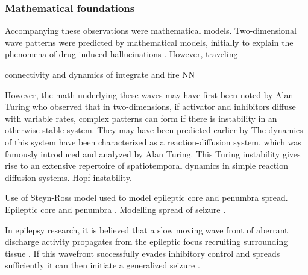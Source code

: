 
\subsubsection*{Mathematical foundations}
Accompanying these observations were mathematical models. Two-dimensional wave patterns were predicted by mathematical models, initially to explain the phenomena of drug induced hallucinations \citep{Ermentrout1979a}. However, traveling 

connectivity and dynamics of integrate and fire NN \citep{CHU1994}

However, the math underlying these waves may have first been noted by Alan Turing who observed that in two-dimensions, if activator and inhibitors diffuse with variable rates, complex patterns can form if there is instability in an otherwise stable system. They may have been predicted earlier by 
The dynamics of this system have been characterized as a reaction-diffusion system, which was famously introduced and analyzed by Alan Turing. This Turing instability gives rise to an extensive repertoire of spatiotemporal dynamics in simple reaction diffusion systems. Hopf instability. \citep{Steyn-Ross}

Use of Steyn-Ross model used to model epileptic core and penumbra spread. Epileptic core and penumbra \citep{Schevon2012}. Modelling spread of seizure \citep{Smith2016a, Martinet2015, Martinet2017}.

In epilepsy research, it is believed that a slow moving wave front of aberrant discharge activity propagates from the epileptic focus recruiting surrounding tissue \citep{Schevon2012, Weiss2013, Martinet2015, Martinet2017, Smith2016a, Eissa2016}. If this wavefront successfully evades inhibitory control and spreads sufficiently it can then initiate a generalized seizure \citep{Schevon2012}.



